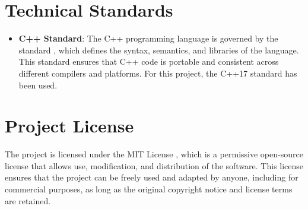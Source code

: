 \section{Technical Standards}
\begin{itemize}
    \item \textbf{C++ Standard}: The C++ programming language is governed by the standard \cite{cpp-standard}, which defines the syntax, semantics, and libraries of the language. This standard ensures that C++ code is portable and consistent across different compilers and platforms. For this project, the C++17 standard \cite{cpp17-standard} has been used.
\end{itemize}

\section{Project License}
The project is licensed under the MIT License \cite{mit-license}, which is a permissive open-source license that allows use, modification, and distribution of the software. This license ensures that the project can be freely used and adapted by anyone, including for commercial purposes, as long as the original copyright notice and license terms are retained.

